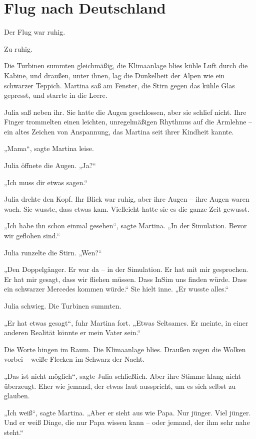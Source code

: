 \documentclass[
]{article}
\begin{document}
\section{Flug nach Deutschland}\label{flug-nach-deutschland}

Der Flug war ruhig.

Zu ruhig.

Die Turbinen summten gleichmäßig, die Klimaanlage blies kühle Luft durch die Kabine, und draußen, unter ihnen, lag die Dunkelheit der Alpen wie ein schwarzer Teppich. Martina saß am Fenster, die Stirn gegen das kühle Glas gepresst, und starrte in die Leere.

Julia saß neben ihr. Sie hatte die Augen geschlossen, aber sie schlief nicht. Ihre Finger trommelten einen leichten, unregelmäßigen Rhythmus auf die Armlehne -- ein altes Zeichen von Anspannung, das Martina seit ihrer Kindheit kannte.

„Mama``, sagte Martina leise.

Julia öffnete die Augen. „Ja?{\kern0pt}``

„Ich muss dir etwas sagen.``

Julia drehte den Kopf. Ihr Blick war ruhig, aber ihre Augen -- ihre Augen waren wach. Sie wusste, dass etwas kam. Vielleicht hatte sie es die ganze Zeit gewusst.

„Ich habe ihn schon einmal gesehen``, sagte Martina. „In der Simulation. Bevor wir geflohen sind.``

Julia runzelte die Stirn. „Wen?{\kern0pt}``

„Den Doppelgänger. Er war da -- in der Simulation. Er hat mit mir gesprochen. Er hat mir gesagt, dass wir fliehen müssen. Dass InSim uns finden würde. Dass ein schwarzer Mercedes kommen würde.`` Sie hielt inne. „Er wusste alles.``

Julia schwieg. Die Turbinen summten.

„Er hat etwas gesagt``, fuhr Martina fort. „Etwas Seltsames. Er meinte, in einer anderen Realität könnte er mein Vater sein.``

Die Worte hingen im Raum. Die Klimaanlage blies. Draußen zogen die Wolken vorbei -- weiße Flecken im Schwarz der Nacht.

„Das ist nicht möglich``, sagte Julia schließlich. Aber ihre Stimme klang nicht überzeugt. Eher wie jemand, der etwas laut ausspricht, um es sich selbst zu glauben.

„Ich weiß``, sagte Martina. „Aber er sieht aus wie Papa. Nur jünger. Viel jünger. Und er weiß Dinge, die nur Papa wissen kann -- oder jemand, der ihm sehr nahe steht.``
\end{document}
